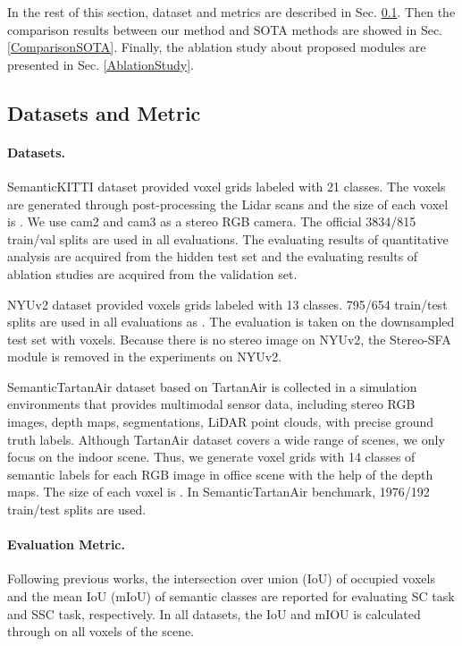\documentclass{article}
\begin{document}
	In the rest of this section, dataset and metrics are described in Sec. \ref{DatasetsandMetric}. Then the comparison results between our method and SOTA methods are showed in Sec. \ref{ComparisonSOTA}. Finally, the ablation study about proposed modules are presented in Sec. \ref{AblationStudy}.
	\subsection{Datasets and Metric}
	\label{DatasetsandMetric}
	
	\paragraph{Datasets.} SemanticKITTI \cite{behley2019semantickitti} dataset provided  voxel grids labeled with 21 classes. The voxels are generated through post-processing the Lidar scans and the size of each voxel is . We use cam2 and cam3 as a stereo RGB camera. The official 3834/815 train/val splits are used in all evaluations. The evaluating results of quantitative analysis are acquired from the hidden test set and the evaluating results of ablation studies are acquired from the validation set.
	
	NYUv2 \cite{silberman2012indoor} dataset provided  voxels grids labeled with 13 classes. 795/654
	train/test splits are used in all evaluations as \cite{Cao_2022_CVPR,li2019rgbd}. The evaluation is taken on the downsampled test set with  voxels. Because there is no stereo image on NYUv2, the Stereo-SFA module is removed in the experiments on NYUv2.
	
	SemanticTartanAir dataset based on TartanAir \cite{tartanair2020iros} is collected in a simulation environments that provides multimodal sensor data, including stereo RGB images, depth maps, segmentations, LiDAR point clouds, with precise ground truth labels. Although TartanAir dataset covers a wide range of scenes, we only focus on the indoor scene. Thus, we generate  voxel grids with 14 classes of semantic labels for each RGB image in office scene with the help of the depth maps. The size of each voxel is . In SemanticTartanAir benchmark, 1976/192 train/test splits are used.
	
	\paragraph{Evaluation Metric.} Following previous works, the intersection over union (IoU) of occupied voxels and the mean IoU (mIoU) of semantic classes are reported for evaluating SC task and SSC task, respectively. In all datasets, the IoU and mIOU is calculated through on all voxels of the scene.
\end{document}

